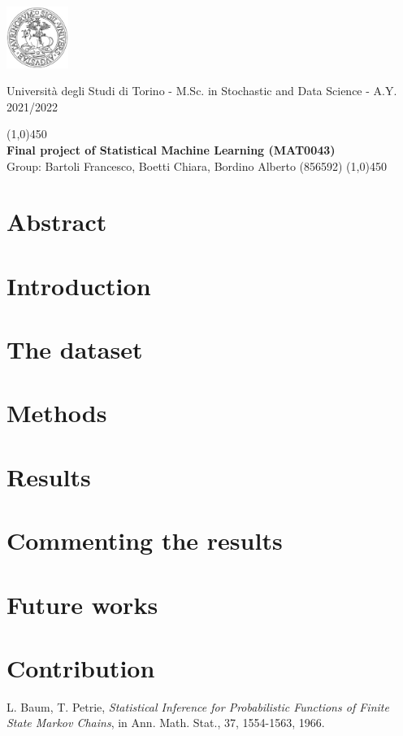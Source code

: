 \documentclass[a4paper,10pt, oneside]{article}  %
\begin{document}
\setcounter{secnumdepth}{2}
\pagestyle{plain} %

\centerline {\includegraphics[width=2cm]{logo.jpg}}
\begin{center}
Università degli Studi di Torino - M.Sc.  in Stochastic and Data Science - A.Y.  2021/2022

\line(1,0){450}\\ 
\vspace{0.1cm} 
{\Large \textbf{ Final project of Statistical Machine Learning (MAT0043)}} \\ 
\vspace{0.1cm}
\hspace{0cm} 
Group: Bartoli Francesco,  Boetti Chiara, Bordino Alberto (856592)
\line(1,0){450} \\
\end{center}


\begin{multicols}{2}
\section*{Abstract}


\section{Introduction}


\section{The dataset}


\section{Methods}


\section{Results}


\section{Commenting the results}


\section{Future works}


\section{Contribution}


\end{multicols}

\begin{thebibliography}{11}   %
 L. Baum, T. Petrie, \textit{Statistical Inference for Probabilistic Functions of Finite State Markov Chains}, in Ann. Math. Stat., 37, 1554-1563, 1966.
\end{thebibliography}
\end{document}
